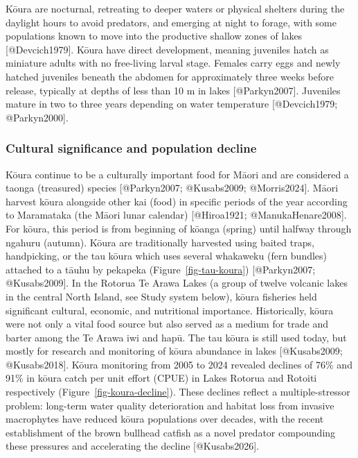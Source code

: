 \documentclass[
  letterpaper,
  DIV=11,
  numbers=noendperiod]{scrartcl}
\begin{document}
Kōura are nocturnal, retreating to deeper waters or physical shelters
during the daylight hours to avoid predators, and emerging at night to
forage, with some populations known to move into the productive shallow
zones of lakes {[}@Devcich1979{]}. Kōura have direct development,
meaning juveniles hatch as miniature adults with no free-living larval
stage. Females carry eggs and newly hatched juveniles beneath the
abdomen for approximately three weeks before release, typically at
depths of less than 10 m in lakes {[}@Parkyn2007{]}. Juveniles mature in
two to three years depending on water temperature {[}@Devcich1979;
@Parkyn2000{]}.

\subsubsection{Cultural significance and population
decline}\label{cultural-significance-and-population-decline}

Kōura continue to be a culturally important food for Māori and are
considered a taonga (treasured) species {[}@Parkyn2007; @Kusabs2009;
@Morris2024{]}. Māori harvest kōura alongside other kai (food) in
specific periods of the year according to Maramataka (the Māori lunar
calendar) {[}@Hiroa1921; @ManukaHenare2008{]}. For kōura, this period is
from beginning of kōanga (spring) until halfway through ngahuru
(autumn). Kōura are traditionally harvested using baited traps,
handpicking, or the tau kōura which uses several whakaweku (fern
bundles) attached to a tāuhu by pekapeka (Figure~\ref{fig-tau-koura})
{[}@Parkyn2007; @Kusabs2009{]}. In the Rotorua Te Arawa Lakes (a group
of twelve volcanic lakes in the central North Island, see Study system
below), kōura fisheries held significant cultural, economic, and
nutritional importance. Historically, kōura were not only a vital food
source but also served as a medium for trade and barter among the Te
Arawa iwi and hapū. The tau kōura is still used today, but mostly for
research and monitoring of kōura abundance in lakes {[}@Kusabs2009;
@Kusabs2018{]}. Kōura monitoring from 2005 to 2024 revealed declines of
76\% and 91\% in kōura catch per unit effort (CPUE) in Lakes Rotorua and
Rotoiti respectively (Figure~\ref{fig-koura-decline}). These declines
reflect a multiple-stressor problem: long-term water quality
deterioration and habitat loss from invasive macrophytes have reduced
kōura populations over decades, with the recent establishment of the
brown bullhead catfish as a novel predator compounding these pressures
and accelerating the decline {[}@Kusabs2026{]}.
\end{document}

